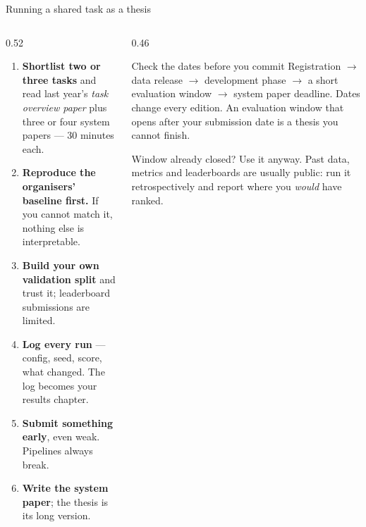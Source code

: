 \documentclass[aspectratio=169,11pt]{beamer}
\newcommand{\key}[1]{\textbf{\color{brand}#1}}
\begin{document}
\begin{frame}{Running a shared task as a thesis}
\begin{columns}[T]
\begin{column}{0.52\textwidth}
\footnotesize
\begin{enumerate}
  \item \key{Shortlist two or three tasks} and read last year's \emph{task
        overview paper} plus three or four system papers --- 30 minutes each.
  \item \key{Reproduce the organisers' baseline first.} If you cannot match it,
        nothing else is interpretable.
  \item \key{Build your own validation split} and trust it; leaderboard
        submissions are limited.
  \item \key{Log every run} --- config, seed, score, what changed. The log
        becomes your results chapter.
  \item \key{Submit something early}, even weak. Pipelines always break.
  \item \key{Write the system paper}; the thesis is its long version.
\end{enumerate}
\end{column}
\begin{column}{0.46\textwidth}
\begin{alertblock}{Check the dates before you commit}
\footnotesize
Registration $\rightarrow$ data release $\rightarrow$ development phase
$\rightarrow$ a short evaluation window $\rightarrow$ system paper deadline.
Dates change every edition. An evaluation window that opens after your
submission date is a thesis you cannot finish.
\end{alertblock}
\begin{block}{Window already closed?}
\footnotesize
Use it anyway. Past data, metrics and leaderboards are usually public: run it
retrospectively and report where you \emph{would} have ranked.
\end{block}
\end{column}
\end{columns}
\end{frame}
\end{document}
